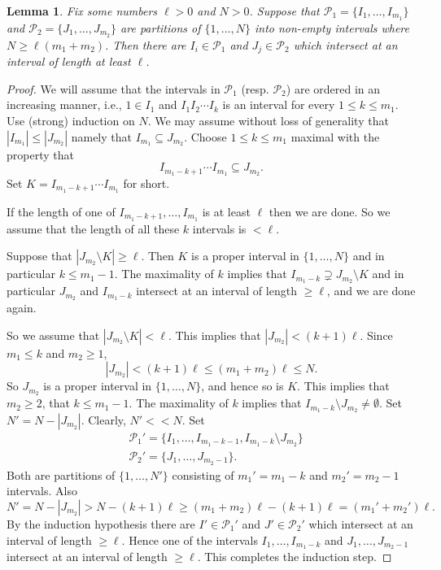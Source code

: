 \documentclass[12pt]{amsart}
\newtheorem{lemma}[prop]{Lemma}
\theoremstyle{definition}
\newcommand{\C}[1]{\mathcal{#1}}
\begin{document}
\begin{lemma}\label{L:collision of partitions}
Fix some numbers $\ell >0$ and $N>0$.
Suppose that $\C P_1=\{I_1,\dots,I_{m_1}\}$ and $\C P_2=\{J_1,\dots,J_{m_2}\}$ are partitions of $\{1,\dots,N\}$ into non-empty intervals where $N \geq \ell(m_1+m_2)$.
Then there are $I_i \in \C P_1$ and $J_j \in \C P_2$ which intersect at an interval of length at least $\ell$.
\end{lemma}

\begin{proof}
We will assume that the intervals in $\C P_1$ (resp. $\C P_2$) are ordered in an increasing manner, i.e., $1 \in I_1$ and $I_1 I_2 \cdots I_k$ is an interval for every $1 \leq k \leq m_1$.
Use (strong) induction on $N$.
We may assume without loss of generality that $|I_{m_1}| \leq |J_{m_2}|$ namely that $I_{m_1} \subseteq J_{m_2}$.
Choose $1 \leq k \leq m_1$ maximal with the property that
\[
I_{m_1-k+1} \cdots I_{m_1} \subseteq J_{m_2}.
\]
Set $K=I_{m_1-k+1} \cdots I_{m_1}$ for short.

If the length of one of $I_{m_1-k+1}, \dots ,I_{m_1}$ is at least $\ell$ then we are done.
So we assume that the length of all these $k$ intervals is $<\ell$.

Suppose that $|J_{m_2} \setminus K| \geq \ell$.
Then $K$ is a proper interval in $\{1,\dots,N\}$ and in particular $k \leq m_1-1$.
The maximality of $k$ implies that $I_{m_1-k} \supsetneq J_{m_2} \setminus K$ and in particular $J_{m_2}$ and $I_{m_1-k}$ intersect at an interval of length $\geq \ell$, and we are done again.

So we assume that $|J_{m_2} \setminus K| < \ell$.
This implies that $|J_{m_2}| < (k+1) \ell$.
Since $m_1 \leq k$ and $m_2 \geq 1$,
\[
|J_{m_2}| < (k+1)\ell \leq (m_1+m_2)\ell \leq N.
\]
So $J_{m_2}$ is a proper interval in $\{1,\dots,N\}$, and hence so is $K$.
This implies that $m_2 \geq 2$, that $k \leq m_1-1$.
The maximality of $k$ implies that $I_{m_1-k} \setminus J_{m_2} \neq \emptyset$.
Set $N'=N-|J_{m_2}|$.
Clearly, $N'<<N$.
Set
\begin{align*}
& \C P_1' =\{ I_1, \dots,I_{m_1-k-1}, I_{m_1-k} \setminus J_{m_2} \} \\
& \C P_2' =\{J_1,\dots,J_{m_2-1}\}.
\end{align*}
Both are partitions of $\{1,\dots,N'\}$ consisting of $m_1'=m_1-k$ and $m_2'=m_2-1$ intervals.
Also
\[
N'=N-|J_{m_2}| > 
N - (k+1)\ell \geq 
(m_1+m_2)\ell -(k+1) \ell =
(m_1'+m_2') \ell.
\]
By the induction hypothesis there are $I' \in \C P_1'$ and $J' \in \C P_2'$ which intersect at an interval of length $\geq \ell$.
Hence one of the intervals $I_1,\dots,I_{m_1-k}$ and $J_1,\dots,J_{m_2-1}$ intersect at an interval of length $\geq \ell$.
This completes the induction step.
\end{proof}
\end{document}
